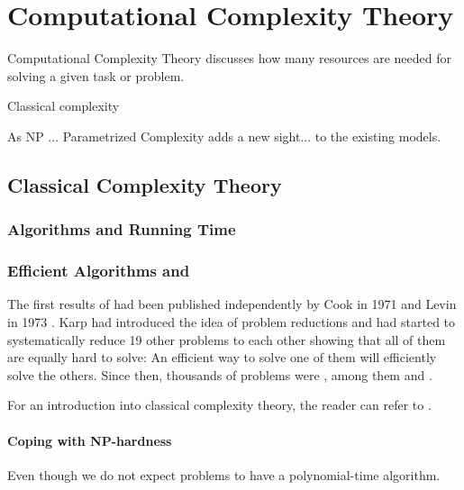 \section{Computational Complexity Theory}

Computational Complexity Theory discusses how many resources are needed for solving a given task or problem. 

Classical complexity

As NP ... Parametrized Complexity adds a new sight... to the existing models.


\subsection{Classical Complexity Theory}

\subsubsection*{Algorithms and Running Time}

\subsubsection*{Efficient Algorithms and \NPcn}

The first results of \NPcn had been published independently by Cook \cite{Cook1971} in 1971 and Levin in 1973 \cite{Levin1973}. 
Karp \cite{Karp1972} had introduced the idea of problem reductions and had started to systematically reduce 19 other problems to each other showing that all of them are equally hard to solve: An efficient way to solve one of them will efficiently solve the others. Since then, thousands of problems were \NPc, among them \dom and \sdom. 


% 

For an introduction into classical complexity theory, the reader can refer to \cite{Arora2006}.

\paragraph{Coping with NP-hardness}

Even though we do not expect \NPc problems to have a polynomial-time algorithm.


